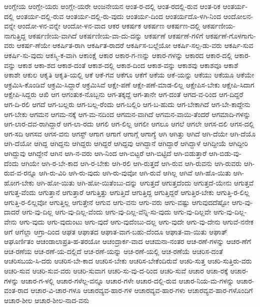 ಆಂಗ್ಲೇಯ
ಆಂಗ್ಲೇ-ಯರು
ಆಂಗ್ಲೇ-ಯರೇ
ಆಂಜನೇಯನ
ಆಂತ-ರ-ದಲ್ಲಿ
ಆಂತ-ರದಲ್ಲಿ-ರುವ
ಆಂತ-ರಿಕ
ಆಂತರ್ಯ-ದಲ್ಲಿ
ಆಂತರ್ಯ-ದಲ್ಲಿ-ರುವ
ಆಂತರ್ಯ-ದಲ್ಲಿ-ರು-ವುದು
ಆಂತರ್ಯ-ದಿಂದ
ಆಂತರ್ಯದೊ-ಳಗಿ-ನಿಂದ
ಆಂದೋಲನ-ವನ್ನೇ
ಆಂದೋ-ಳನ-ವನ್ನೇ
ಆಂದೋ-ಳನ-ವಾದ
ಆಕರ
ಆಕರ್ಷಕ
ಆಕರ್ಷಣ
ಆಕರ್ಷಣ-ದಲ್ಲಿ
ಆಕರ್ಷಣೀಯ-ನಾಗುತ್ತಿದ್ದ
ಆಕರ್ಷಣೀಯ-ವಾಗಿದೆ
ಆಕರ್ಷಣೀಯ-ವಾ-ದು-ದನ್ನು
ಆಕರ್ಷಣೆ
ಆಕರ್ಷಣೆ-ಗಳಿಗೆ
ಆಕರ್ಷಣೆ-ಗೊಳಗಾಗು-ವರು
ಆಕರ್ಷ-ಣೆಯೇ
ಆಕರ್ಷಿತ-ರಾಗಿ
ಆಕರ್ಷಿತ-ರಾದರೆ
ಆಕರ್ಷಿಸ-ಬಲ್ಲೆಯೋ
ಆಕರ್ಷಿ-ಸಲ್ಪ-ಡು-ವರು
ಆಕರ್ಷಿ-ಸುವ
ಆಕರ್ಷಿ-ಸು-ವುದು
ಆಕಸ್ಮಿ-ಕ-ವಾಗಿ
ಆಕಾಂಕ್ಷೆ
ಆಕಾರ
ಆಕಾರ-ಗ-ಣನ್ನು
ಆಕಾರ-ಗಳನ್ನು
ಆಕಾರದ
ಆಕಾರ-ದಲ್ಲಿ
ಆಕಾರ-ವನ್ನು
ಆಕಾಶ
ಆಕಾ-ಶದ
ಆಕಾಶ-ದಂತೆ
ಆಕಾಶ-ದಲ್ಲಿ
ಆಕಾಶ-ದಿಂದ
ಆಕಾಶ-ವನ್ನು
ಆಕಾಶವು
ಆಕಾಶವೂ
ಆಕಾಶೆ
ಆಕಾಶೇ
ಆಕುಲ
ಆಕೃತಿ
ಆಕೃತಿ-ಯಲ್ಲಿ
ಆಕೆ
ಆಕೆ-ಗವ
ಆಕೆಗೂ
ಆಕೆಗೆ
ಆಕೆಯ
ಆಕೆ-ಯನ್ನು
ಆಕೆಯು
ಆಕೆಯೂ
ಆಕೆಯೇ
ಆಕ್ರಮಿಸಿ-ಕೊಂಡಿವೆ
ಆಕ್ರಮಿ-ಸಿದ್ದಾರೆ
ಆಕ್ರಮಿಸಿವೆ
ಆಕ್ಷೇ-ಪಣೆ
ಆಕ್ಷೇ-ಪಣೆ-ಮಾಡ-ಲಿಲ್ಲ
ಆಕ್ಷೇಪಿಸ-ಬೇಕು
ಆಕ್ಷೇಪಿ-ಸಿದಾಗ
ಆಕ್ಷೇಪಿ-ಸಿದ್ದರು
ಆಖಿ
ಆಗ
ಆಗಂತುಕ-ನೊಬ್ಬನು
ಆಗ-ತಕ್ಕದ್ದೆ
ಆಗ-ತಾನೇ
ಆಗ-ದಂತೆ
ಆಗದ-ವ-ರಿಂದ
ಆಗ-ದಿದ್ದರೆ
ಆಗ-ದಿ-ರಲಿ
ಆಗದೆ
ಆಗ-ಬಲ್ಲರು
ಆಗ-ಬಲ್ಲ-ರೆಂದು
ಆಗ-ಬಲ್ಲಿರಿ
ಆಗ-ಬ-ಹುದು
ಆಗ-ಬೇಕಾಗಿದೆ
ಆಗ-ಬೇ-ಕಾದ್ದೇನು
ಆಗ-ಬೇಕು
ಆಗಮನ
ಆಗಮ-ನಕ್ಕೆ
ಆಗ-ಮ-ನದಿಂದ
ಆಗಮನ-ವಾಗಿದೆ
ಆಗಮನ-ವಾಯಿ-ತೆಂದರೆ
ಆಗಮಾದಿ-ಗಳನ್ನು
ಆಗ-ಲಾರ-ದವ-ರಾಗಿದ್ದಾರೆ
ಆಗ-ಲಾ-ರದು
ಆಗಲಿ
ಆಗ-ಲಿಲ್ಲ
ಆಗಲೀ
ಆಗಲೂ
ಆಗಲೆ
ಆಗಲೇ
ಆಗಸ-ದಲಿ
ಆಗಸ-ದಲ್ಲಿ
ಆಗ-ಸದಿ
ಆಗಸವ
ಆಗಸ-ವನು
ಆಗಸ್ಟ್
ಆಗಾಗ
ಆಗಾಗೆ
ಆಗಾಗ್ಗೆ
ಆಗಾಗ್ಯೆ
ಆಗಿ
ಆಗಿತ್ತು
ಆಗಿದೆ
ಆಗಿ-ದೆಯೇ
ಆಗಿ-ದೆಯೊ
ಆಗಿ-ದೆಯೋ
ಆಗಿದ್ದ
ಆಗಿದ್ದನು
ಆಗಿದ್ದರು
ಆಗಿದ್ದರೆ
ಆಗಿದ್ದವು
ಆಗಿದ್ದಾನೆ
ಆಗಿದ್ದಾರೆ
ಆಗಿದ್ದಾಳೆ
ಆಗಿದ್ದೀಯೆ
ಆಗಿದ್ದೀರಿ
ಆಗಿದ್ದುವು
ಆಗಿದ್ದೇನೆ
ಆಗಿನ
ಆಗಿ-ನ-ವರು
ಆಗಿ-ನಿಂದ
ಆಗಿ-ಬಿಟ್ಟರೆ
ಆಗಿ-ಬಿಟ್ಟಿದೆ
ಆಗಿ-ಬಿಡುತ್ತಾರೆ
ಆಗಿ-ಬಿಡು-ವು-ದೆಂದು
ಆಗಿಯೇ
ಆಗಿ-ರ-ಬೇ-ಕಾದ
ಆಗಿ-ರ-ಬೇಕು
ಆಗಿ-ರಲಿ
ಆಗಿ-ರುತ್ತದೆ
ಆಗಿ-ರುವ
ಆಗಿ-ರುವನು
ಆಗಿ-ರುವರು
ಆಗಿ-ರುವ-ವ-ರನ್ನೂ
ಆಗಿ-ರು-ವಿರಿ
ಆಗಿ-ರು-ವುದು
ಆಗಿ-ರು-ವುವೋ
ಆಗಿ-ರುವೆ
ಆಗಿಲ್ಲ
ಆಗಿವೆ
ಆಗಿ-ಹೊ-ಯಿತು
ಆಗಿ-ಹೋಗ-ಬೇಕು
ಆಗಿ-ಹೋ-ಯಿತು
ಆಗಿ-ಹೋ-ಯಿತೆಂಬು-ದನ್ನು
ಆಗುತ್ತದೆ
ಆಗುತ್ತದೆಂದು
ಆಗುತ್ತದೆ-ಯೇನು
ಆಗುತ್ತವೆ
ಆಗುತ್ತ-ವೆಂದು
ಆಗುತ್ತಾನೆ
ಆಗುತ್ತಾರೆ
ಆಗುತ್ತಿತ್ತು
ಆಗುತ್ತಿದೆ
ಆಗುತ್ತಿದ್ದ
ಆಗುತ್ತಿದ್ದರೆ
ಆಗುತ್ತಿರ-ಬೇಕು
ಆಗುತ್ತಿ-ರ-ಲಿಲ್ಲ
ಆಗುತ್ತಿ-ರ-ಲಿಲ್ಲವೋ
ಆಗುತ್ತಿಲ್ಲ
ಆಗುತ್ತೇನೆ
ಆಗುವ
ಆಗು-ವನು
ಆಗು-ವರು
ಆಗು-ವಷ್ಟು
ಆಗುವುದದೆಷ್ಟೋ
ಆಗು-ವು-ದಾದರೆ
ಆಗು-ವು-ದಿಲ್ಲ
ಆಗು-ವು-ದಿಲ್ಲ-ವೆಂದು
ಆಗು-ವು-ದಿಲ್ಲ-ವೆನ್ನಿ-ಸು-ವುದು
ಆಗು-ವು-ದಿಲ್ಲವೇ
ಆಗು-ವು-ದಿಲ್ಲ-ವೇನು
ಆಗು-ವುದು
ಆಗು-ವುದುಂಟು
ಆಗು-ವುದೆ
ಆಗು-ವುದೆಂಬು-ದಲ್ಲ
ಆಗು-ವುದೇ
ಆಗು-ವು-ದೇನು
ಆಗುವೆ-ನನೇಕ
ಆಗೆ
ಆಗೆಲ್ಲಾ
ಆಗ್ರಾ-ದಿಂದ
ಆಘತ
ಆಘಾತದ
ಆಘಾತ-ವಾಗ-ಬಹು-ದೆಂದೂ
ಆಘಾತ-ವಾ-ಯಿತು
ಆಘಾತ್
ಆಘೂರ್ಣಿತಂ
ಆಚಂಡಾಲಾಪ್ರತಿ-ಹ-ತರಯೋ
ಆಚಂದ್ರಾರ್ಕ-ವಾದ
ಆಚಮನಾ-ನಂತರ
ಆಚ-ರಣೆ-ಗಳನ್ನು
ಆಚರ-ಣೆಗೆ
ಆಚ-ರಣೆಯ
ಆಚ-ರಣೆ-ಯ-ದಲ್ಲಿದೆ
ಆಚ-ರಣೆ-ಯನ್ನು
ಆಚ-ರಣೆ-ಯಲ್ಲಿ
ಆಚ-ರಣೆಯೆ
ಆಚರಿಸ-ದಂತೆ
ಆಚರಿಸಬಯ-ಸಿ-ದರು
ಆಚರಿಸ-ಬೇ-ಕಾದ
ಆಚರಿಸ-ಬೇಕು
ಆಚರಿಸ-ಬೇಕೆಂದಿರುವೆ
ಆಚರಿ-ಸುತ್ತ
ಆಚರಿ-ಸುತ್ತಿರು-ವರು
ಆಚರಿ-ಸುವ
ಆಚರಿ-ಸುವ-ವರು
ಆಚರಿ-ಸುವಾಗ
ಆಚರಿ-ಸು-ವು-ದ-ರಿಂದ
ಆಚರಿ-ಸುವೆ
ಆಚಾರ
ಆಚಾ-ರಕ್ಕೆ
ಆಚಾರ-ಗಳನ್ನು
ಆಚಾರ-ಗ-ಳಲ್ಲಿ
ಆಚಾರ-ಗಳೆಲ್ಲ-ವನ್ನೂ
ಆಚಾರ-ಗಳೇ
ಆಚಾರ-ದಲ್ಲಿ-ರುವ
ಆಚಾರ-ನಿಯ-ಮ-ಗಳನ್ನು
ಆಚಾರ-ವಂತ-ರಾದ
ಆಚಾರ-ವಿ-ಚಾರ-ಗಳೂ
ಆಚಾರವ್ಯವ-ಹಾರ-ಗಳ
ಆಚಾರವ್ಯವ-ಹಾರ-ಗಳು
ಆಚಾರವ್ಯವ-ಹಾರ-ಗಳೊಂದಿಗೆ
ಆಚಾರ-ಶೀಲ
ಆಚಾರ-ಶೀಲ-ನಾದ-ವನು
